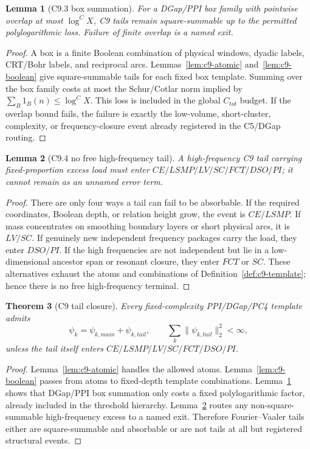 \documentclass[11pt]{article}
\newtheorem{theorem}{Theorem}[section]
\newtheorem{lemma}[theorem]{Lemma}
\theoremstyle{definition}
\begin{document}
\begin{lemma}[C9.3 box summation]\label{lem:c9-box}
For a DGap/PPI box family with pointwise overlap at most $\log^C X$, C9 tails remain square-summable up to the permitted polylogarithmic loss.  Failure of finite overlap is a named exit.
\end{lemma}
\begin{proof}
A box is a finite Boolean combination of physical windows, dyadic labels, CRT/Bohr labels, and reciprocal arcs.  Lemmas~\ref{lem:c9-atomic} and~\ref{lem:c9-boolean} give square-summable tails for each fixed box template.  Summing over the box family costs at most the Schur/Cotlar norm implied by $\sum_B1_B(n)\le\log^C X$.  This loss is included in the global $C_{tot}$ budget.  If the overlap bound fails, the failure is exactly the low-volume, short-cluster, complexity, or frequency-closure event already registered in the C5/DGap routing.
\end{proof}

\begin{lemma}[C9.4 no free high-frequency tail]\label{lem:c9-high}
A high-frequency C9 tail carrying fixed-proportion excess load must enter $CE/LSMP/LV/SC/FCT/DSO/PI$; it cannot remain as an unnamed error term.
\end{lemma}
\begin{proof}
There are only four ways a tail can fail to be absorbable.  If the required coordinates, Boolean depth, or relation height grow, the event is $CE/LSMP$.  If mass concentrates on smoothing boundary layers or short physical arcs, it is $LV/SC$.  If genuinely new independent frequency packages carry the load, they enter $DSO/PI$.  If the high frequencies are not independent but lie in a low-dimensional ancestor span or resonant closure, they enter $FCT$ or $SC$.  These alternatives exhaust the atoms and combinations of Definition~\ref{def:c9-template}; hence there is no free high-frequency terminal.
\end{proof}

\begin{theorem}[C9 tail closure]\label{thm:c9}
Every fixed-complexity PPI/DGap/PC4 template admits
\[
  \psi_k=\psi_{k,main}+\psi_{k,tail},\qquad \sum_k\|\psi_{k,tail}\|_2^2<\infty,
\]
unless the tail itself enters $CE/LSMP/LV/SC/FCT/DSO/PI$.
\end{theorem}
\begin{proof}
Lemma~\ref{lem:c9-atomic} handles the allowed atoms.  Lemma~\ref{lem:c9-boolean} passes from atoms to fixed-depth template combinations.  Lemma~\ref{lem:c9-box} shows that DGap/PPI box summation only costs a fixed polylogarithmic factor, already included in the threshold hierarchy.  Lemma~\ref{lem:c9-high} routes any non-square-summable high-frequency excess to a named exit.  Therefore Fourier--Vaaler tails either are square-summable and absorbable or are not tails at all but registered structural events.
\end{proof}
\end{document}

